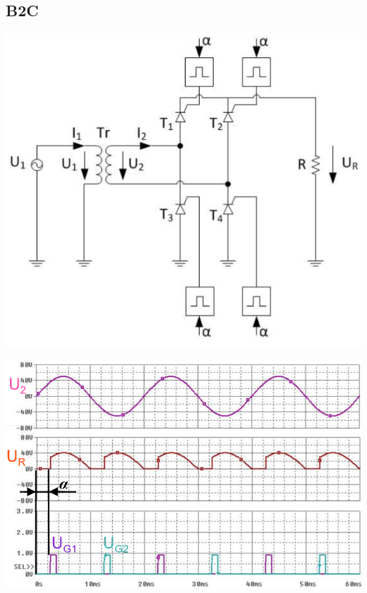 \subsection{B2C}
\begin{minipage}{0.4\linewidth}
    \includegraphics[width=0.8\linewidth]{images/GRB2c}
\end{minipage}
\begin{minipage}{0.35\linewidth}
    \centering 
    \includegraphics[width=0.8\linewidth]{images/B2CKl}
    
\end{minipage}
\begin{minipage}{0.25\linewidth}
\end{minipage}
\newline
\vspace{-0.8cm}
